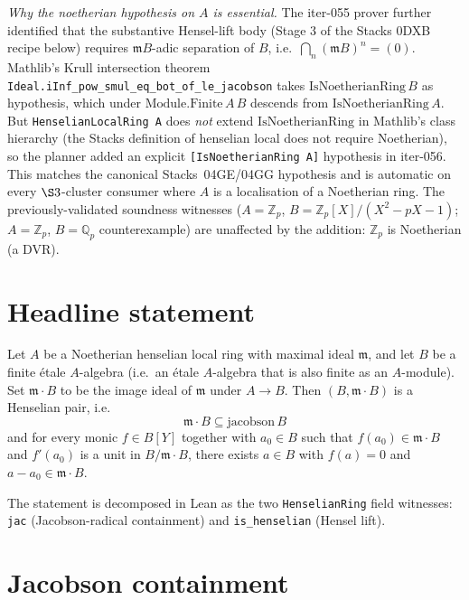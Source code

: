 \emph{Why the noetherian hypothesis on $A$ is essential.}
The iter-055 prover further identified that the substantive
Hensel-lift body (Stage 3 of the Stacks 0DXB recipe below) requires
$\mathfrak m B$-adic separation of $B$, i.e.\ $\bigcap_n
(\mathfrak m B)^n = (0)$. Mathlib's Krull intersection theorem
\texttt{Ideal.iInf\_pow\_smul\_eq\_bot\_of\_le\_jacobson} takes
$\mathrm{IsNoetherianRing}\,B$ as hypothesis, which under
$\mathrm{Module.Finite}\,A\,B$ descends from
$\mathrm{IsNoetherianRing}\,A$. But \texttt{HenselianLocalRing A}
does \emph{not} extend $\mathrm{IsNoetherianRing}$ in Mathlib's
class hierarchy (the Stacks definition of henselian local does not
require Noetherian), so the planner added an explicit
\texttt{[IsNoetherianRing A]} hypothesis in iter-056. This matches
the canonical Stacks~04GE/04GG hypothesis and is automatic on every
$\S 3$-cluster consumer where $A$ is a localisation of a Noetherian
ring. The previously-validated soundness witnesses
($A = \mathbb{Z}_p$, $B = \mathbb{Z}_p[X]/(X^2 - pX - 1)$;
$A = \mathbb{Z}_p$, $B = \mathbb{Q}_p$ counterexample) are
unaffected by the addition: $\mathbb{Z}_p$ is Noetherian (a DVR).

\section{Headline statement}

\begin{theorem}
\label{thm:henselianRing-map-maximalIdeal}
Let $A$ be a Noetherian henselian local ring with maximal ideal
$\mathfrak m$, and let $B$ be a finite étale $A$-algebra (i.e.\ an
étale $A$-algebra that is also finite as an $A$-module). Set
$\mathfrak m \cdot B$ to be the image ideal of $\mathfrak m$
under $A \to B$. Then $(B, \mathfrak m \cdot B)$ is a Henselian
pair, i.e.\
\[
  \mathfrak m \cdot B \subseteq \mathrm{jacobson}\,B
\]
and for every monic $f \in B[Y]$ together with $a_0 \in B$ such
that $f(a_0) \in \mathfrak m \cdot B$ and $f'(a_0)$ is a unit
in $B / \mathfrak m \cdot B$, there exists $a \in B$ with
$f(a) = 0$ and $a - a_0 \in \mathfrak m \cdot B$.
\end{theorem}

The statement is decomposed in Lean as the two \texttt{HenselianRing}
field witnesses: \texttt{jac} (Jacobson-radical containment) and
\texttt{is\_henselian} (Hensel lift).

\section{Jacobson containment}

